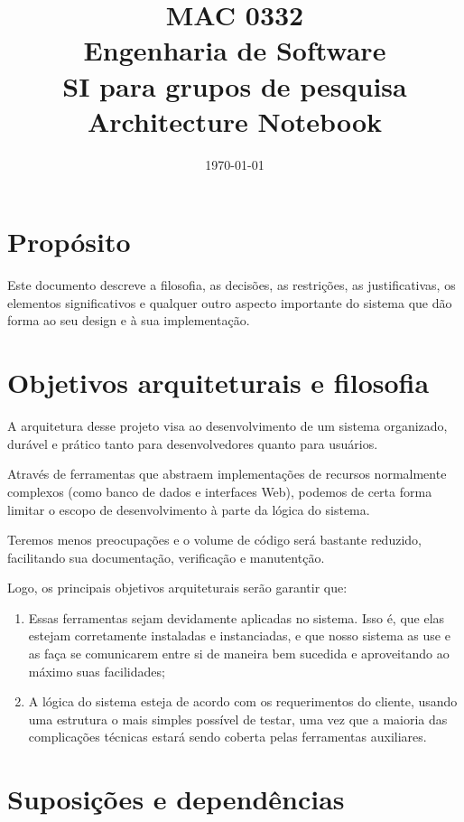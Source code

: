 \documentclass[11pt, a4paper]{article}
\title{MAC 0332\\
	Engenharia de Software\\
	SI para grupos de pesquisa\\
	Architecture Notebook}
\date{\today}
\begin{document}
	\maketitle
	\newpage
	
	\section{Propósito}
        Este documento descreve a filosofia, as decisões, as restrições, as
        justificativas, os elementos significativos e qualquer outro aspecto
        importante do sistema que dão forma ao seu design e à sua implementação.

    \section{Objetivos arquiteturais e filosofia}
        A arquitetura desse projeto visa ao desenvolvimento de um sistema
        organizado, durável e prático tanto para desenvolvedores quanto para
        usuários.

        Através de ferramentas que abstraem implementações de recursos
        normalmente complexos (como banco de dados e interfaces Web), podemos
        de certa forma limitar o escopo de desenvolvimento à parte da lógica do
        sistema.

        Teremos menos preocupações e o volume de código será bastante reduzido,
        facilitando sua documentação, verificação e manutentção.

        Logo, os principais objetivos arquiteturais serão garantir que:

        \begin{enumerate}
            \item Essas ferramentas sejam devidamente aplicadas no sistema.
            Isso é, que elas estejam corretamente instaladas e instanciadas,
            e que nosso sistema as use e as faça se comunicarem entre si de
            maneira bem sucedida e aproveitando ao máximo suas facilidades;

            \item A lógica do sistema esteja de acordo com os requerimentos do
            cliente, usando uma estrutura o mais simples possível de testar, uma
            vez que a maioria das complicações técnicas estará sendo coberta
            pelas ferramentas auxiliares.
        \end{enumerate}

    \section{Suposições e dependências}
\end{document}
